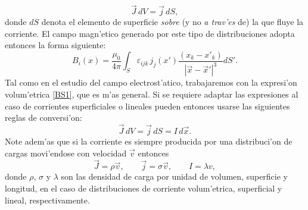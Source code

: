 \begin{equation}
\vec{J}\,dV=\vec{j}\,dS,
\end{equation}
donde $dS$ denota el elemento de superficie \textit{sobre} (y no \textit{a trav'es} de) la que fluye la corriente. El campo magn'etico generado por este tipo de distribuciones adopta entonces la forma siguiente:
\begin{equation}
 \boxed{B_i(x)=\frac{\mu_0}{4\pi}\int_S\varepsilon_{ijk}\,j_j(x')
\frac{\left(x_k-x'_k\right)}{\left\vert\vec{x}-\vec{x}'\right\vert^3}dS'. }
\label{BSsup}
\end{equation}
Tal como en el estudio del campo electrost'atico, trabajaremos con la expresi'on volum'etrica \eqref{BS1}, que es m'as general. Si se requiere adaptar las expresiones al caso de corrientes superficiales o lineales pueden entonces usarse las siguientes reglas de conversi'on:
\begin{equation}\label{IdxJdV}
\vec{J}\,dV=\vec{j}\,dS=I\,d\vec{x}.
\end{equation}
Note adem'as que si la corriente es siempre producida por una distribuci'on de cargas movi'endose con velocidad $\vec{v}$ entonces 
\begin{equation}
\vec{J}=\rho\vec{v}, \qquad \vec{j}=\sigma\vec{v}, \qquad I=\lambda v,
\end{equation}
donde $\rho$, $\sigma$ y $\lambda$ son las densidad de carga por unidad de volumen, superficie y longitud, en el caso de distribuciones de corriente volum'etrica, superficial y lineal, respectivamente.

